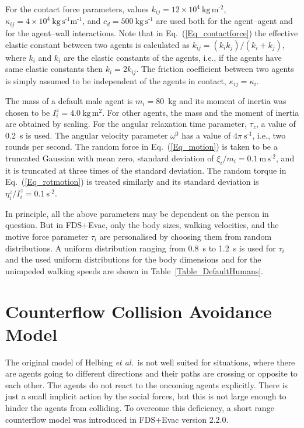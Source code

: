 \documentclass[12pt,a4paper,final,twoside]{stylevk}
\begin{document}
For the contact force parameters, values $k_{ij} = 12 \times 10^4
~\mathrm{ \textrm{kg} \, \textrm{m}^\textrm{-2} }$, $\kappa_{ij} = 4
\times 10^4 ~\mathrm{ \textrm{kg} \, \textrm{s}^\textrm{-1}
  \textrm{m}^\textrm{-1} } $, and $c_d = 500 ~\mathrm{\textrm{kg} \,
  \textrm{s}^\textrm{-1} } $ are used both for the agent--agent and
for the agent--wall interactions.  Note that in
Eq.~(\ref{Eq_contactforce}) the effective elastic constant between two
agents is calculated as $k_{ij} = (k_i k_j)/(k_i+k_j)$, where $k_i$
and $k_i$ are the elastic constants of the agents, i.e., if the
agents have same elastic constants then $k_{i} = 2 k_{ij}$.  The
friction coefficient between two agents is simply assumed to be
independent of the agents in contact, $\kappa_{ij} = \kappa_i$.


The mass of a default male agent is $m_i = 80$~kg and its moment of
inertia was chosen to be $I^z_{i} = 4.0 ~\mathrm{ \textrm{kg} \,
  \textrm{m}^\textrm{2} }$.  For other agents, the mass and the moment
of inertia are obtained by scaling.  For the angular relaxation time
parameter, $\tau_z$, a value of 0.2~s is used.  The angular velocity
parameter $\omega^0$ has a value of $4\pi~\mathrm{
  \textrm{s}^\textrm{-1} } $, i.e., two rounds per second.  The
random force in Eq.~(\ref{Eq_motion}) is taken to be a truncated
Gaussian with mean zero, standard deviation of $ {\xi}_i/m_i = 0.1
~\mathrm{ \textrm{m} \, \textrm{s}^\textrm{-2}}$, and it is truncated
at three times of the standard deviation.  The random torque in
Eq.~(\ref{Eq_rotmotion}) is treated similarly and its standard deviation
is $ {\eta}^z_{i}/ I^z_{i} = 0.1 ~\mathrm{ \textrm{s}^\textrm{-2}}$.


In principle, all the above parameters may be dependent on the person
in question.  But in FDS+Evac, only the body sizes, walking
velocities, and the motive force parameter $\tau_i$ are personalised
by choosing them from random distributions.  A uniform distribution
ranging from 0.8~s to 1.2~s is used for $\tau_i$ and the used uniform
distributions for the body dimensions and for the unimpeded walking
speeds are shown in Table~\ref{Table_DefaultHumans}.


\section{Counterflow Collision Avoidance Model}\label{Sec_CF_Model}

\noindent The original model of Helbing \emph{et al.}\ is not well
suited for situations, where there are agents going to different
directions and their paths are crossing or opposite to each other.
The agents do not react to the oncoming agents explicitly.  There is
just a small implicit action by the social forces, but this is not
large enough to hinder the agents from colliding.  To overcome this
deficiency, a short range counterflow model was introduced in FDS+Evac
version 2.2.0.
\end{document}
